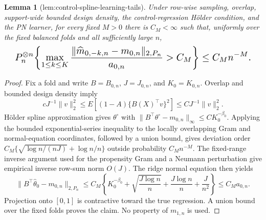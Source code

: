 \documentclass{article}
\newtheorem{lemma}{Lemma}
\begin{document}
\begin{lemma}[lem:control-spline-learning-tails]\label{lem:control-spline-learning-tails}
Under row-wise sampling, overlap, support-wide bounded design density, the control-regression H\"older condition, and the PN learner, for every fixed \(M>0\) there is \(C_M<\infty\) such that, uniformly over the fixed balanced folds and all sufficiently large \(n\),
\[
\makebox[\linewidth][c]{\resizebox{0.98\linewidth}{!}{\par\noindent \makebox[\linewidth][c]{\resizebox{0.98\linewidth}{!}{\(\displaystyle \displaystyle P_n^{\otimes n}\!\left\{\max_{1\le k\le K}\frac{\lVert\widehat m_{0,-k,n}-m_{0,n}\rVert_{2,P_n}}{a_{0,n}}>C_M\right\}\le C_Mn^{-M}.\)}}\par\noindent}}
\]
\end{lemma}
\begin{proof}
Fix a fold and write \(B=B_{0,n}\), \(J=J_{0,n}\), and \(K_0=K_{0,n}\). Overlap and bounded design density imply
\[cJ^{-1}\lVert v\rVert_2^2\le E[(1-A)\{B(X)^\top v\}^2]\le CJ^{-1}\lVert v\rVert_2^2.\tag{1}\]
H\"older spline approximation gives \(\theta^\circ\) with \(\lVert B^\top\theta^\circ-m_{0,n}\rVert_\infty\le CK_0^{-\beta_0}\). Applying the bounded exponential-series inequality to the locally overlapping Gram and normal-equation coordinates, followed by a union bound, gives deviation order \(C_M\{\sqrt{\log n/(nJ)}+\log n/n\}\) outside probability \(C_Mn^{-M}\). The fixed-range inverse argument used for the propensity Gram and a Neumann perturbation give empirical inverse row-sum norm \(O(J)\). The ridge normal equation then yields
\[\lVert B^\top\widehat\theta_0-m_{0,n}\rVert_{2,P_n}\le C_M\left\{K_0^{-\beta_0}+\sqrt{\frac{J\log n}{n}}+\frac{J\log n}{n}+\frac{J}{n^2}\right\}\le C_Ma_{0,n}.\tag{2}\]
Projection onto \([0,1]\) is contractive toward the true regression. A union bound over the fixed folds proves the claim. No property of \(m_{1,n}\) is used.
\end{proof}
\end{document}
